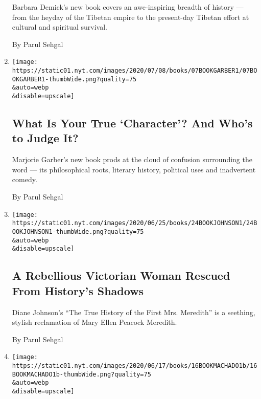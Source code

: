 \begin{enumerate}
  Barbara Demick's new book covers an awe-inspiring breadth of history
  --- from the heyday of the Tibetan empire to the present-day Tibetan
  effort at cultural and spiritual survival.

  By Parul Sehgal
\item
  \href{/2020/07/07/books/review-character-history-cultural-obsession-marjorie-garber.html}{}

  \texttt{[image: https://static01.nyt.com/images/2020/07/08/books/07BOOKGARBER1/07BOOKGARBER1-thumbWide.png?quality=75\\\&auto=webp\\\&disable=upscale]}

  \hypertarget{what-is-your-true-character-and-whos-to-judge-it}{%
  \subsection{What Is Your True `Character'? And Who's to Judge
  It?}\label{what-is-your-true-character-and-whos-to-judge-it}}

  Marjorie Garber's new book prods at the cloud of confusion surrounding
  the word --- its philosophical roots, literary history, political uses
  and inadvertent comedy.

  By Parul Sehgal
\item
  \href{/2020/06/24/books/review-true-history-first-mrs-meredith-diane-johnson.html}{}

  \texttt{[image: https://static01.nyt.com/images/2020/06/25/books/24BOOKJOHNSON1/24BOOKJOHNSON1-thumbWide.png?quality=75\\\&auto=webp\\\&disable=upscale]}

  \hypertarget{a-rebellious-victorian-woman-rescued-from-historys-shadows}{%
  \subsection{A Rebellious Victorian Woman Rescued From History's
  Shadows}\label{a-rebellious-victorian-woman-rescued-from-historys-shadows}}

  Diane Johnson's ``The True History of the First Mrs. Meredith'' is a
  seething, stylish reclamation of Mary Ellen Peacock Meredith.

  By Parul Sehgal
\item
  \href{/2020/06/16/books/review-posthumous-memoirs-bras-cubas-machado-de-assis.html}{}

  \texttt{[image: https://static01.nyt.com/images/2020/06/17/books/16BOOKMACHADO1b/16BOOKMACHADO1b-thumbWide.png?quality=75\\\&auto=webp\\\&disable=upscale]}

  \hypertarget{a-playful-masterpiece-that-expanded-the-novels-possibilities}{%
}
\end{enumerate}

